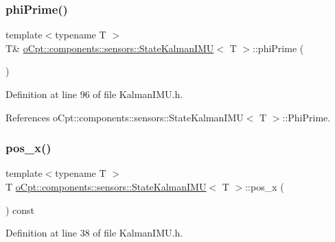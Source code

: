 \subsubsection{\texorpdfstring{phi\+Prime()}{phiPrime()}\hspace{0.1cm}{\footnotesize\ttfamily [2/2]}}
{\footnotesize\ttfamily template$<$typename T $>$ \\
T\& \hyperlink{classo_cpt_1_1components_1_1sensors_1_1_state_kalman_i_m_u}{o\+Cpt\+::components\+::sensors\+::\+State\+Kalman\+I\+MU}$<$ T $>$\+::phi\+Prime (\begin{DoxyParamCaption}{ }\end{DoxyParamCaption})\hspace{0.3cm}{\ttfamily [inline]}}



Definition at line 96 of file Kalman\+I\+M\+U.\+h.



References o\+Cpt\+::components\+::sensors\+::\+State\+Kalman\+I\+M\+U$<$ T $>$\+::\+Phi\+Prime.

\hypertarget{classo_cpt_1_1components_1_1sensors_1_1_state_kalman_i_m_u_ac0efd425529d4e3d6297e2a36c97ba54}{}\label{classo_cpt_1_1components_1_1sensors_1_1_state_kalman_i_m_u_ac0efd425529d4e3d6297e2a36c97ba54} 
\subsubsection{\texorpdfstring{pos\+\_\+x()}{pos\_x()}\hspace{0.1cm}{\footnotesize\ttfamily [1/2]}}
{\footnotesize\ttfamily template$<$typename T $>$ \\
T \hyperlink{classo_cpt_1_1components_1_1sensors_1_1_state_kalman_i_m_u}{o\+Cpt\+::components\+::sensors\+::\+State\+Kalman\+I\+MU}$<$ T $>$\+::pos\+\_\+x (\begin{DoxyParamCaption}{ }\end{DoxyParamCaption}) const\hspace{0.3cm}{\ttfamily [inline]}}



Definition at line 38 of file Kalman\+I\+M\+U.\+h.



